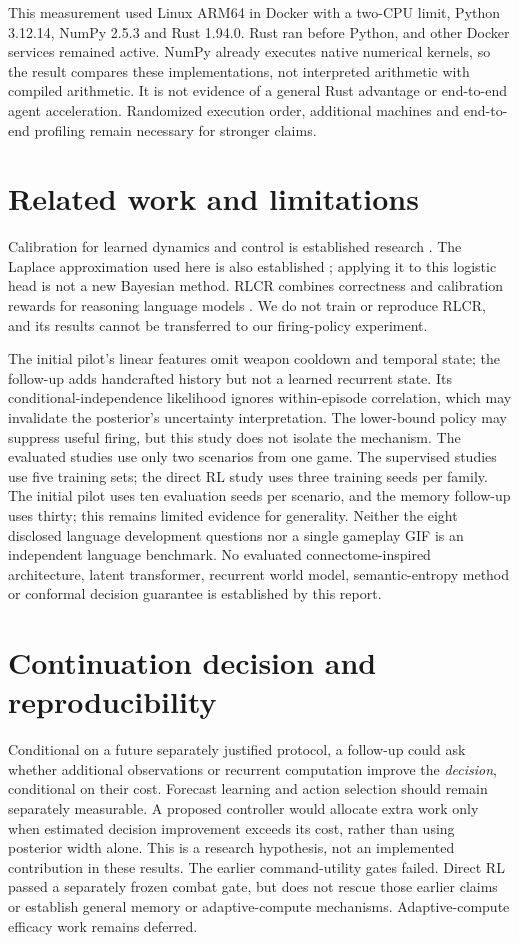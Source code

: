 \documentclass[11pt]{article}
\begin{document}
This measurement used Linux ARM64 in Docker with a two-CPU limit, Python 3.12.14, NumPy 2.5.3 and Rust 1.94.0. Rust ran before Python, and other Docker services remained active. NumPy already executes native numerical kernels, so the result compares these implementations, not interpreted arithmetic with compiled arithmetic. It is not evidence of a general Rust advantage or end-to-end agent acceleration. Randomized execution order, additional machines and end-to-end profiling remain necessary for stronger claims.

\section{Related work and limitations}
Calibration for learned dynamics and control is established research \citep{malik2019calibrated}. The Laplace approximation used here is also established \citep{daxberger2021laplace}; applying it to this logistic head is not a new Bayesian method. RLCR combines correctness and calibration rewards for reasoning language models \citep{damani2025beyond}. We do not train or reproduce RLCR, and its results cannot be transferred to our firing-policy experiment.

The initial pilot's linear features omit weapon cooldown and temporal state; the follow-up adds handcrafted history but not a learned recurrent state. Its conditional-independence likelihood ignores within-episode correlation, which may invalidate the posterior's uncertainty interpretation. The lower-bound policy may suppress useful firing, but this study does not isolate the mechanism. The evaluated studies use only two scenarios from one game. The supervised studies use five training sets; the direct RL study uses three training seeds per family. The initial pilot uses ten evaluation seeds per scenario, and the memory follow-up uses thirty; this remains limited evidence for generality. Neither the eight disclosed language development questions nor a single gameplay GIF is an independent language benchmark. No evaluated connectome-inspired architecture, latent transformer, recurrent world model, semantic-entropy method or conformal decision guarantee is established by this report.

\section{Continuation decision and reproducibility}
Conditional on a future separately justified protocol, a follow-up could ask whether additional observations or recurrent computation improve the \emph{decision}, conditional on their cost. Forecast learning and action selection should remain separately measurable. A proposed controller would allocate extra work only when estimated decision improvement exceeds its cost, rather than using posterior width alone. This is a research hypothesis, not an implemented contribution in these results. The earlier command-utility gates failed. Direct RL passed a separately frozen combat gate, but does not rescue those earlier claims or establish general memory or adaptive-compute mechanisms. Adaptive-compute efficacy work remains deferred.
\end{document}
